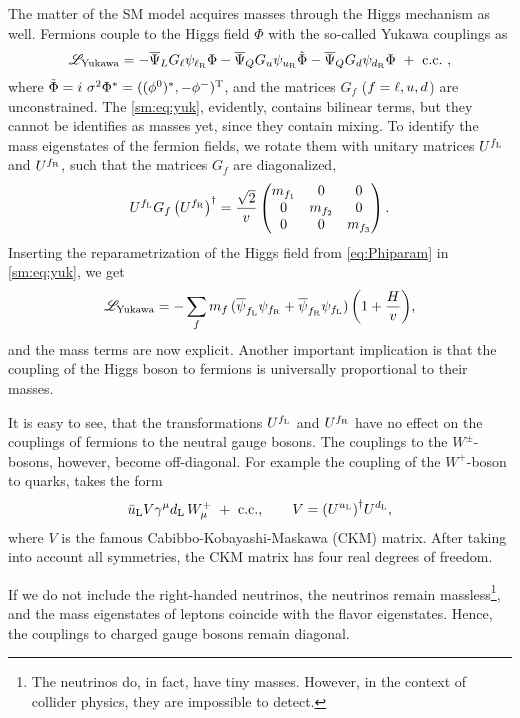 The matter of the SM model acquires masses through the Higgs mechanism as well. 
Fermions couple to the Higgs field $\Phi$ with the so-called Yukawa couplings as
\begin{equation} \label{sm:eq:yuk}
{\mathscr{L}}_{\text{Yukawa}} = -\overline\Psi_L G_\ell \psi_{\ell_{\mathrm{R}}}\Phi
-\overline\Psi_Q G_u \psi_{u_{\mathrm{R}}}\tilde\Phi
-\overline\Psi_Q G_d \psi_{d_{\mathrm{R}}}\Phi
~+~\text{c.c.}~,
\end{equation}
where $\tilde\Phi= i~\sigma^2\Phi^*=((\phi^0)^*,-\phi^-)^{\mathrm{T}}$,
and the matrices $G_f$ ($f=\ell,u,d$) are unconstrained.
The \cref{sm:eq:yuk}, evidently, contains bilinear terms, but they cannot be identifies as masses yet,
since they contain mixing.
To identify the mass eigenstates of the fermion fields, we 
rotate them with unitary matrices $U^{f_{{\mathrm{L}}}}$ and $U^{f_{{\mathrm{R}}}}$,
such that the matrices $G_f$ are diagonalized,
\begin{align}\label{eq:diagyuk}
  U^{f_{\rL}}G_{f}\left(U^{{f}_{\rR}}\right)^\dagger = \frac{\sqrt{2}}{v} \pmqty{m_{f_1} &0&0\\0&m_{f_2}&0\\0&0&m_{f_3} }. 
\end{align}
Inserting the reparametrization of the Higgs field from \cref{eq:Phiparam} in \cref{sm:eq:yuk}, we get
\begin{equation}
{\mathscr{L}}_{{\text{Yukawa}}} = -\sum_f m_f \,
(\overline\psi_{f_{\mathrm{L}}}\psi_{f_{\mathrm{R}}}+\overline\psi_{f_{\mathrm{R}}}\psi_{f_{\mathrm{L}}})
\, \biggl(1+\frac{H}{v}\biggr),
\end{equation}
and the mass terms are now explicit.
Another important implication is that the coupling of the Higgs boson
to fermions is universally proportional to their masses.

It is easy to see, that the transformations $U^{f_{{\mathrm{L}}}}$ and $U^{f_{{\mathrm{R}}}}$ have no effect on the couplings of fermions to the 
neutral gauge bosons. The couplings to the $W^{\pm}$-bosons, however, become off-diagonal.
For example the coupling of the $W^+$-boson to quarks, takes the form
\begin{equation}
  \bar{u}_{\mathrm{L}} V \gamma^\mu d_{\mathrm{L}} \, W_\mu^+ ~+~ \text{c.c.}, \qquad V = \qty(U^{u_{{\mathrm{L}}}})^\dagger U^{d_{{\mathrm{L}}}},
\end{equation}
where $V$ is the famous Cabibbo-Kobayashi-Maskawa (CKM) matrix.
After taking into account all symmetries, the CKM matrix has four real degrees of freedom.

If we do not include the right-handed neutrinos, the neutrinos remain massless\footnote{
  The neutrinos do, in fact, have tiny masses. However, in the context of collider physics,
  they are impossible to detect.
},
and the mass eigenstates of leptons coincide with the flavor eigenstates. Hence,
the couplings to charged gauge bosons remain diagonal.


